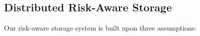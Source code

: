 \documentclass[sigconf]{aamas}
\begin{document}





\subsection{Distributed Risk-Aware Storage}
Our risk-aware storage system is built upon three assumptions:
\end{document}
